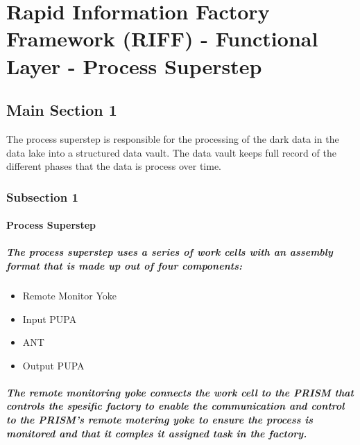 
\chapter{Rapid Information Factory Framework (RIFF) - Functional Layer - Process Superstep} %

\label{Chapter13} %



\section{Main Section 1}

The process superstep is responsible for the processing of the dark data in the data lake into a structured data vault. The data vault keeps full record of the different phases that the data is process over time.

\subsection{Subsection 1}

\subsubsection{Process Superstep}
\paragraph{The process superstep uses a series of work cells with an assembly format that is made up out of four components:}
\begin{itemize}
\item{Remote Monitor Yoke}
\item{Input PUPA}
\item{ANT}
\item{Output PUPA}
\end{itemize}
\paragraph{The remote monitoring yoke connects the work cell to the PRISM that controls the spesific factory to enable the communication and control to the PRISM's remote motering yoke to ensure the process is monitored and that it comples it assigned task in the factory.}
